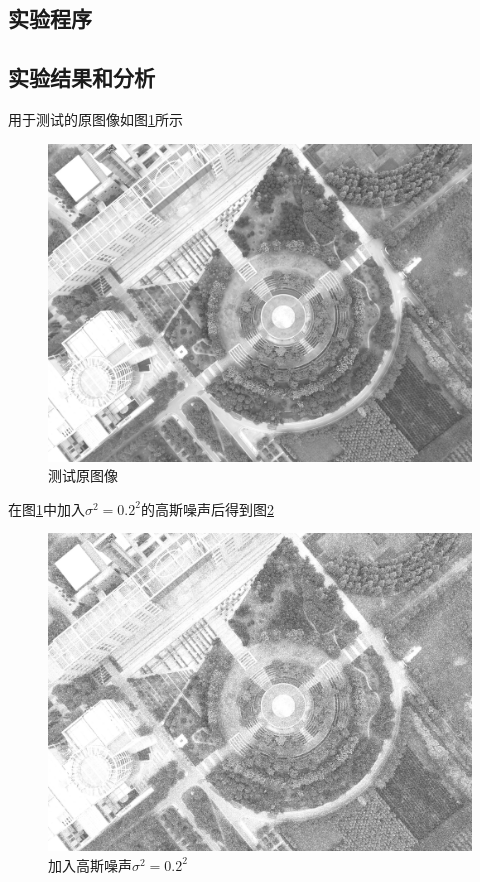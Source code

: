 \subsection{实验程序}




\subsection{实验结果和分析}
用于测试的原图像如图\ref{fig:dji0027gray}所示
\begin{figure}[H]
	\centering
	\includegraphics[width=0.7\linewidth]{figure/DJI_0027_Gray}
	\caption{测试原图像}
	\label{fig:dji0027gray}
\end{figure}
在图\ref{fig:dji0027gray}中加入$\sigma^2=0.2^2$的高斯噪声后得到图\ref{fig:dji0027withnoise}
\begin{figure}[H]
	\centering
	\includegraphics[width=0.7\linewidth]{figure/DJI_0027_With_Noise}
	\caption{加入高斯噪声$\sigma^2=0.2^2$}
	\label{fig:dji0027withnoise}
\end{figure}
